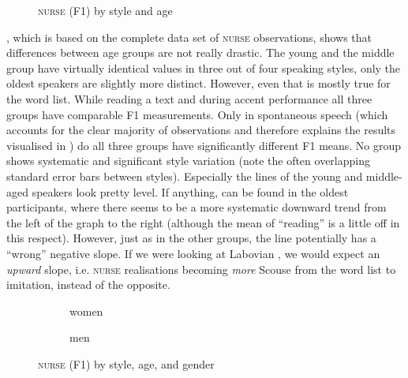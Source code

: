 \largerpage
\begin{figure}
	
		\resizebox{0.5\linewidth}{!}{} 
	\caption{\textsc{nurse} (F1) by style and age}
	\label{fig.line.f1.nurse.tot}
\end{figure}

, which is based on the complete data set of \textsc{nurse} observations, shows that differences between age groups are not really drastic.
The young and the middle group have virtually identical values in three out of four speaking styles, only the oldest speakers are slightly more distinct.
However, even that is mostly true for the word list.
While reading a text and during accent performance all three groups have comparable F1 measurements.
Only in spontaneous speech (which accounts for the clear majority of observations and therefore explains the results visualised in ) do all three groups have significantly different F1 means.
No group shows systematic and significant style variation (note the often overlapping standard error bars between styles).
Especially the lines of the young and middle-aged speakers look pretty level.
If anything,  can be found in the oldest participants, where there seems to be a more systematic downward trend from the left of the graph to the right (although the mean of ``reading'' is a little off in this respect).
However, just as in the other groups, the line potentially has a ``wrong'' negative slope.
If we were looking at Labovian , we would expect an \emph{upward} slope, i.e. \textsc{nurse} realisations becoming \emph{more} Scouse from the word list to imitation, instead of the opposite.

\begin{figure}
	
	\begin{subfigure}{.49\textwidth}
		
			\resizebox{\linewidth}{!}{} 
		\caption{women}
		\label{fig.line.f1.nurse.women}
	\end{subfigure}
	\begin{subfigure}{.49\textwidth}
		
			\resizebox{\linewidth}{!}{} 
		\caption{men}
		\label{fig.line.f1.nurse.men}
	\end{subfigure}
	\caption{\textsc{nurse} (F1) by style, age, and gender}
\end{figure}

